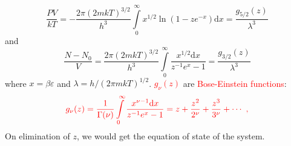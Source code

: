 \documentclass[12pt,a4paper]{article}
\newcommand{\dif}{\mathrm{d}}
\begin{document}
\begin{equation}
\frac{PV}{kT} = -\frac{2\pi (2mkT)^{3/2}}{h^3} \int\limits_0^\infty x^{1/2} \ln(1-z e^{-x}) \dif x = \frac{g_{5/2}(z)}{\lambda^3} 
\end{equation}
and
\begin{equation}
\frac{N-N_0}{V} = \frac{2\pi (2mkT)^{3/2}}{h^3} \int\limits_0^\infty \frac{x^{1/2} \dif x}{z^{-1} e^x -1} = \frac{g_{3/2}(z)}{\lambda^3}
\end{equation}
where $x = \beta \varepsilon$ and $\lambda = h/(2\pi mkT)^{1/2}$. \textcolor{red}{$g_\nu (z)$} are \textcolor{red}{Bose-Einstein functions}: 
\begin{equation}
\color{red} g_\nu (z) = \frac{1}{\Gamma(\nu)} \int\limits_0^\infty \frac{x^{\nu-1} \dif x}{z^{-1} e^x -1} = z +\frac{z^2}{2^\nu} +\frac{z^3}{3^\nu} +\cdots ~,
\label{BEf}
\end{equation}
On elimination of $z$, we would get the equation of state of the system.
\end{document}
